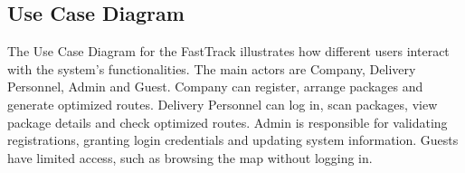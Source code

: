 \subsection{Use Case Diagram}
The Use Case Diagram for the FastTrack illustrates how different users interact with the system’s functionalities. The main actors are Company, Delivery Personnel, Admin and Guest.
Company can register, arrange packages and generate optimized routes. Delivery Personnel can log in, scan packages, view package details and check optimized routes. Admin is responsible for validating registrations, granting login credentials and updating system information. Guests have limited access, such as browsing the map without logging in.

